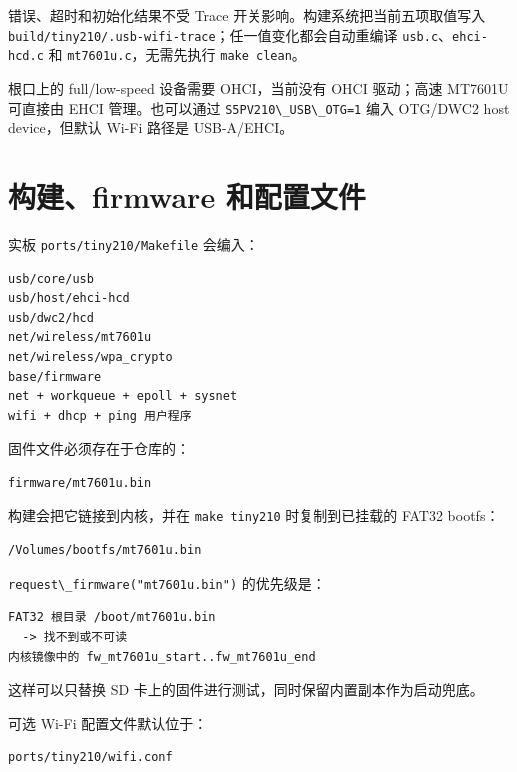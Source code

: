 错误、超时和初始化结果不受 Trace 开关影响。构建系统把当前五项取值写入
\passthrough{\lstinline!build/tiny210/.usb-wifi-trace!}；任一值变化都会自动重编译
\passthrough{\lstinline!usb.c!}、\passthrough{\lstinline!ehci-hcd.c!} 和
\passthrough{\lstinline!mt7601u.c!}，无需先执行
\passthrough{\lstinline!make clean!}。

根口上的 full/low-speed 设备需要 OHCI，当前没有 OHCI 驱动；高速 MT7601U
可直接由 EHCI 管理。也可以通过
\passthrough{\lstinline!S5PV210\_USB\_OTG=1!} 编入 OTG/DWC2 host
device，但默认 Wi-Fi 路径是 USB-A/EHCI。

\section{构建、firmware
和配置文件}\label{ux6784ux5efafirmware-ux548cux914dux7f6eux6587ux4ef6}

实板 \passthrough{\lstinline!ports/tiny210/Makefile!} 会编入：

\begin{lstlisting}
usb/core/usb
usb/host/ehci-hcd
usb/dwc2/hcd
net/wireless/mt7601u
net/wireless/wpa_crypto
base/firmware
net + workqueue + epoll + sysnet
wifi + dhcp + ping 用户程序
\end{lstlisting}

固件文件必须存在于仓库的：

\begin{lstlisting}
firmware/mt7601u.bin
\end{lstlisting}

构建会把它链接到内核，并在 \passthrough{\lstinline!make tiny210!}
时复制到已挂载的 FAT32 bootfs：

\begin{lstlisting}
/Volumes/bootfs/mt7601u.bin
\end{lstlisting}

\passthrough{\lstinline!request\_firmware("mt7601u.bin")!} 的优先级是：

\begin{lstlisting}
FAT32 根目录 /boot/mt7601u.bin
  -> 找不到或不可读
内核镜像中的 fw_mt7601u_start..fw_mt7601u_end
\end{lstlisting}

这样可以只替换 SD 卡上的固件进行测试，同时保留内置副本作为启动兜底。

可选 Wi-Fi 配置文件默认位于：

\begin{lstlisting}
ports/tiny210/wifi.conf
\end{lstlisting}

